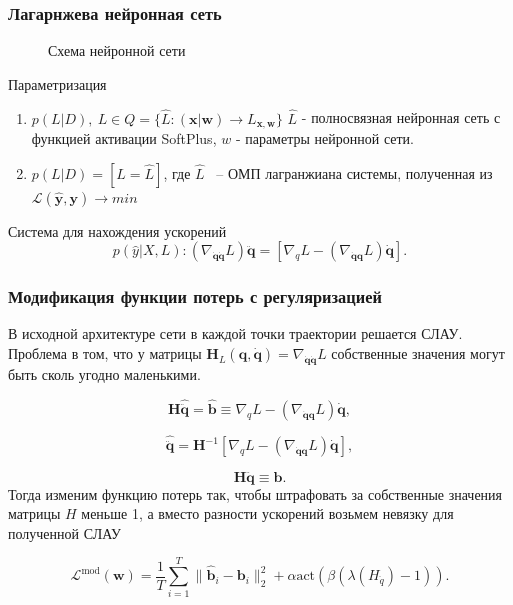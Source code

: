 \documentclass{beamer}
\begin{document}
\begin{frame}
\frametitle{Лагарнжева нейронная сеть}

\begin{figure}[H]
\centerline{
}
\caption{Схема нейронной сети}
\label{fig: LNN}
\end{figure}
\begin{block}{Параметризация}
\begin{enumerate}
\item$p(L|D),\ L \in Q = \{\hat{L} \colon (\mathbf{x} | \mathbf{w}) \to L_{\mathbf{x}, \mathbf{w}}\}$
$\hat{L}$ - полносвязная нейронная сеть с функцией активации SoftPlus, $w$ - параметры нейронной сети.
\item $p(L|D) = [L = \hat{L}]$, где $\hat{L}$ ~-- ОМП лагранжиана системы, полученная из $\mathcal{L}(\hat{\mathbf{y}}, \mathbf{y}) \to min$
\end{enumerate}
\end{block}

\begin{block}{Система для нахождения ускорений}
\[
p(\hat{y}| X, L): \left(\nabla_{\dot{\mathbf{q}} \dot{\mathbf{q}}} L\right)\ddot{\mathbf{q}} = \left[\nabla_{q} L-\left(\nabla_{\dot{\mathbf{q}}\mathbf{q}} L\right) \dot{\mathbf{q}}\right].
\]
\end{block}

\end{frame}



\begin{frame}
\frametitle{Модификация функции потерь с регуляризацией}
В исходной архитектуре сети в каждой точки траектории решается СЛАУ. Проблема в том, что у матрицы $\mathbf{H}_L(\mathbf{q}, \dot{\mathbf{q}}) = \nabla_{\dot{\mathbf{q}} \dot{\mathbf{q}}} L$ собственные значения могут быть сколь угодно маленькими. 

 \[\mathbf{H}\hat{\ddot{\mathbf{q}}} = \hat{\mathbf{b}} \equiv \nabla_{q} L-\left(\nabla_{\dot{\mathbf{q}}\mathbf{q}} L\right) \dot{\mathbf{q}}, \]

$$
\hat{\ddot{\mathbf{q}}} = \mathbf{H}^{-1}\left[\nabla_{q} L-\left(\nabla_{\dot{\mathbf{q}}\mathbf{q}} L\right) \dot{\mathbf{q}}\right],
$$

$$
\mathbf{H}\ddot{\mathbf{q}} \equiv \mathbf{b}.
$$
Тогда изменим функцию потерь так, чтобы штрафовать за собственные значения матрицы $H$  меньше 1, а вместо разности ускорений возьмем невязку для полученной СЛАУ

$$
 \mathcal{L}^{\text{mod}}(\textbf{w}) = \frac{1}{T}\sum_{i=1}^{T} \| \mathbf{\hat{b}}_i - \mathbf{b}_i \|_2^2  + \alpha \text{act}(\beta (\lambda(H_{\ddot{q}}) - 1)).
$$
\end{frame}
\end{document}
